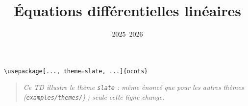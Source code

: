 \documentclass[11pt]{ocots-td}
\title{Équations différentielles linéaires}
\date{2025--2026}
\begin{document}
\maketitle

\begin{lstlisting}
\usepackage[..., theme=slate, ...]{ocots}
\end{lstlisting}
\begin{quote}\itshape
Ce TD illustre le th\`eme \texttt{slate} : m\^eme \'enonc\'e que pour les
autres th\`emes (\texttt{examples/themes/}) ; seule cette ligne change.
\end{quote}


\end{document}
